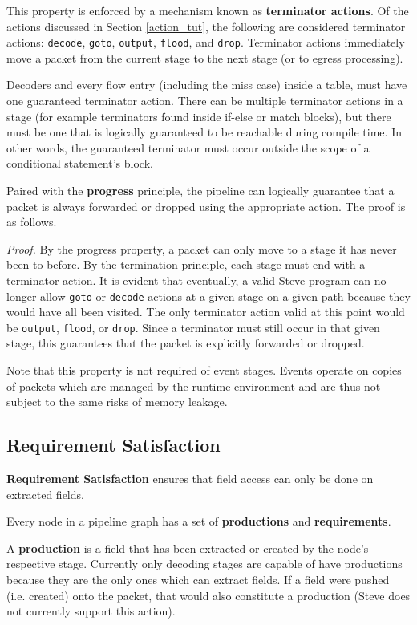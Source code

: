 This property is enforced by a mechanism known as \textbf{terminator actions}. Of the actions discussed in Section \ref{action_tut}, the following are considered terminator actions: \texttt{decode}, \texttt{goto}, \texttt{output}, \texttt{flood}, and \texttt{drop}. Terminator actions immediately move a packet from the current stage to the next stage (or to egress processing). 

Decoders and every flow entry (including the miss case) inside a table, must have one guaranteed terminator action. There can be multiple terminator actions in a stage (for example terminators found inside if-else or match blocks), but there must be one that is logically guaranteed to be reachable during compile time. In other words, the guaranteed terminator must occur outside the scope of a conditional statement's block.

Paired with the \textbf{progress} principle, the pipeline can logically guarantee that a packet is always forwarded or dropped using the appropriate action. The proof is as follows.

\textit{Proof.} By the progress property, a packet can only move to a stage it has never been to before. By the termination principle, each stage must end with a terminator action. It is evident that eventually, a valid Steve program can no longer allow \texttt{goto} or \texttt{decode} actions at a given stage on a given path because they would have all been visited. The only terminator action valid at this point would be \texttt{output}, \texttt{flood}, or \texttt{drop}. Since a terminator must still occur in that given stage, this guarantees that the packet is explicitly forwarded or dropped.

Note that this property is not required of event stages. Events operate on copies of packets which are managed by the runtime environment and are thus not subject to the same risks of memory leakage.

\subsection{Requirement Satisfaction} \label{requirements_guide}

\textbf{Requirement Satisfaction} ensures that field access can only be done on extracted fields. 

Every node in a pipeline graph has a set of \textbf{productions} and \textbf{requirements}.

A \textbf{production} is a field that has been extracted or created by the node's respective stage. Currently only decoding stages are capable of have productions because they are the only ones which can extract fields. If a field were pushed (i.e. created) onto the packet, that would also constitute a production (Steve does not currently support this action).

